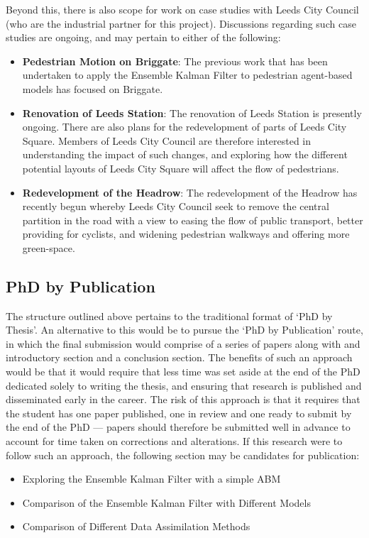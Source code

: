 Beyond this, there is also scope for work on case studies with Leeds City
Council (who are the industrial partner for this project).
Discussions regarding such case studies are ongoing, and may pertain to either
of the following:
\begin{itemize}
    \item \textbf{Pedestrian Motion on Briggate}: The previous work that has
        been undertaken to apply the Ensemble Kalman Filter to pedestrian
        agent-based models has focused on Briggate. 
    \item \textbf{Renovation of Leeds Station}: The renovation of Leeds Station
        is presently ongoing. There are also plans for the redevelopment of
        parts of Leeds City Square. Members of Leeds City Council are therefore
        interested in understanding the impact of such changes, and exploring
        how the different potential layouts of Leeds City Square will affect the
        flow of pedestrians.
    \item \textbf{Redevelopment of the Headrow}: The redevelopment of the
        Headrow has recently begun whereby Leeds City Council seek to remove the
        central partition in the road with a view to easing the flow of public
        transport, better providing for cyclists, and widening pedestrian
        walkways and offering more green-space.
\end{itemize}

\subsection*{PhD by Publication}\label{sub:structure:publication}

The structure outlined above pertains to the traditional format of `PhD by
Thesis'.
An alternative to this would be to pursue the `PhD by Publication' route, in
which the final submission would comprise of a series of papers along with and
introductory section and a conclusion section.
The benefits of such an approach would be that it would require that less time
was set aside at the end of the PhD dedicated solely to writing the thesis, and
ensuring that research is published and disseminated early in the career.
The risk of this approach is that it requires that the student has one paper
published, one in review and one ready to submit by the end of the PhD ---
papers should therefore be submitted well in advance to account for time taken
on corrections and alterations.
If this research were to follow such an approach, the following section may be
candidates for publication:
\begin{itemize}
    \item Exploring the Ensemble Kalman Filter with a simple ABM
    \item Comparison of the Ensemble Kalman Filter with Different Models
    \item Comparison of Different Data Assimilation Methods
\end{itemize}

